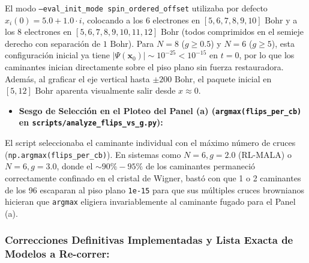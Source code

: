 \documentclass[10pt,a4paper]{article}
\begin{document}
   El modo \texttt{--eval\_init\_mode spin\_ordered\_offset} utilizaba por defecto $x_i(0) = 5.0 + 1.0\cdot i$, colocando a los 6 electrones en $[5, 6, 7, 8, 9, 10]\text{ Bohr}$ y a los 8 electrones en $[5, 6, 7, 8, 9, 10, 11, 12]\text{ Bohr}$ (todos comprimidos en el semieje derecho con separación de $1\text{ Bohr}$). Para $N=8$ ($g \ge 0.5$) y $N=6$ ($g \ge 5$), esta configuración inicial ya tiene $|\Psi(\mathbf{x}_0)| \sim 10^{-25} < 10^{-15}$ en $t=0$, por lo que los caminantes inician directamente sobre el piso plano sin fuerza restauradora. Además, al graficar el eje vertical hasta $\pm 200\text{ Bohr}$, el paquete inicial en $[5, 12]\text{ Bohr}$ aparenta visualmente salir desde $x \approx 0$.



\begin{itemize}
\item \textbf{Sesgo de Selección en el Ploteo del Panel (a) (\texttt{argmax(flips\_per\_cb)} en \texttt{scripts/analyze\_flips\_vs\_g.py}):}
\end{itemize}

   El script seleccionaba el caminante individual con el máximo número de cruces (\texttt{np.argmax(flips\_per\_cb)}). En sistemas como $N=6, g=2.0$ (RL-MALA) o $N=6, g=3.0$, donde el $\sim 90\%-95\%$ de los caminantes permaneció correctamente confinado en el cristal de Wigner, bastó con que 1 o 2 caminantes de los 96 escaparan al piso plano \texttt{1e-15} para que sus múltiples cruces brownianos hicieran que \texttt{argmax} eligiera invariablemente al caminante fugado para el Panel (a).




\subsubsection{Correcciones Definitivas Implementadas y Lista Exacta de Modelos a Re-correr:}
\end{document}
